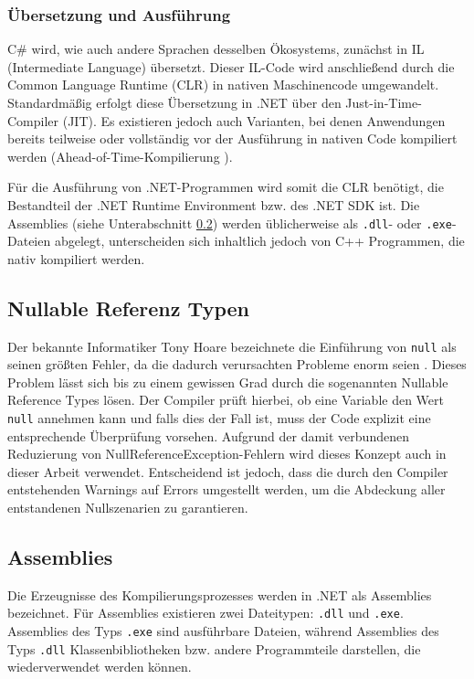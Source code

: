 \subsubsection{Übersetzung und Ausführung}
C\# wird, wie auch andere Sprachen desselben Ökosystems, zunächst in IL (Intermediate Language) übersetzt. Dieser IL-Code wird anschließend durch die Common Language Runtime (CLR) \cite{microsoft-clr-overview} in nativen Maschinencode umgewandelt. Standardmäßig erfolgt diese Übersetzung in .NET über den Just-in-Time-Compiler (JIT). Es existieren jedoch auch Varianten, bei denen Anwendungen bereits teilweise oder vollständig vor der Ausführung in nativen Code kompiliert werden (Ahead-of-Time-Kompilierung \cite{microsoft-native-aot}).

Für die Ausführung von .NET-Programmen wird somit die CLR benötigt, die Bestandteil der .NET Runtime Environment bzw. des .NET SDK ist. Die Assemblies (siehe Unterabschnitt \ref{subsec:assemblies}) werden üblicherweise als \texttt{.dll}- oder \texttt{.exe}-Dateien abgelegt, unterscheiden sich inhaltlich jedoch von C++ Programmen, die nativ kompiliert werden.

\subsection{Nullable Referenz Typen}
\label{subsec:csharp_null_reference_types}
Der bekannte Informatiker Tony Hoare bezeichnete die Einführung von \texttt{null} als seinen größten Fehler, da die dadurch verursachten Probleme enorm seien \cite{hoare_null_video}. Dieses Problem lässt sich bis zu einem gewissen Grad durch die sogenannten Nullable Reference Types \cite{microsoft-nullable-references} lösen. Der Compiler prüft hierbei, ob eine Variable den Wert \texttt{null} annehmen kann und falls dies der Fall ist, muss der Code explizit eine entsprechende Überprüfung vorsehen. Aufgrund der damit verbundenen Reduzierung von NullReferenceException-Fehlern wird dieses Konzept auch in dieser Arbeit verwendet. Entscheidend ist jedoch, dass die durch den Compiler entstehenden Warnings auf Errors umgestellt werden, um die Abdeckung aller entstandenen Nullszenarien zu garantieren.

\subsection{Assemblies}
\label{subsec:assemblies}
Die Erzeugnisse des Kompilierungsprozesses werden in .NET als Assemblies \cite{msdn_assembly_manifest} bezeichnet. Für Assemblies existieren zwei Dateitypen: \texttt{.dll} und \texttt{.exe}. Assemblies des Typs \texttt{.exe} sind ausführbare Dateien, während Assemblies des Typs \texttt{.dll} Klassenbibliotheken bzw. andere Programmteile darstellen, die wiederverwendet werden können.

